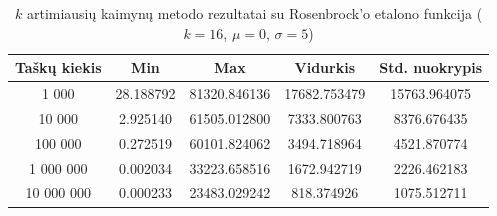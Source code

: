 \begin{table}[H]
    \centering
    \begin{tabular}{|c|c|c|c|c|}
        \hline
        \textbf{Taškų kiekis} & \textbf{Min} & \textbf{Max} & \textbf{Vidurkis} & \textbf{Std. nuokrypis} \\ \hline
        1 000        & 28.188792 & 81320.846136 & 17682.753479 & 15763.964075 \\ \hline
        10 000       & 2.925140 & 61505.012800 & 7333.800763 & 8376.676435 \\ \hline
        100 000      & 0.272519 & 60101.824062 & 3494.718964 & 4521.870774 \\ \hline
        1 000 000    & 0.002034 & 33223.658516 & 1672.942719 & 2226.462183 \\ \hline
        10 000 000   & 0.000233 & 23483.029242 & 818.374926 & 1075.512711 \\ \hline
    \end{tabular}
    \caption{$k$ artimiausių kaimynų metodo rezultatai su Rosenbrock'o etalono funkcija ($k = 16$, $\mu = 0$, $\sigma = 5$)}
\end{table}